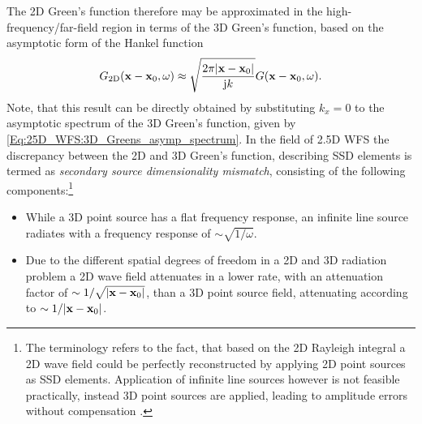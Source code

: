 \vspace{3mm}
The 2D Green's function therefore may be approximated in the high-frequency/far-field region in terms of the 3D Green's function, based on the asymptotic form of the Hankel function \cite[(10.2.6)]{Nist2010} 
\begin{equation}
G_{2\mathrm{D}}(\mathbf{x}- \mathbf{x}_0,\omega) \approx \sqrt{\frac{ 2\pi |\mathbf{x} - \mathbf{x}_0|}{\mathrm{j} k }}
G(\mathbf{x}-\mathbf{x}_0, \omega).
\label{eq:25D_WFS:2D_Greens_vs_3D} 
\end{equation}
Note, that this result can be directly obtained by substituting $k_x = 0$ to the asymptotic spectrum of the 3D Green's function, given by \eqref{Eq:25D_WFS:3D_Greens_asymp_spectrum}.
In the field of 2.5D WFS the discrepancy between the 2D and 3D Green's function, describing SSD elements is termed as \emph{secondary source dimensionality mismatch}, consisting of the following components:\footnote{The terminology refers to the fact, that based on the 2D Rayleigh integral a 2D wave field could be perfectly reconstructed by applying 2D point sources as SSD elements. Application of infinite line sources however is not feasible practically, instead 3D point sources are applied, leading to amplitude errors without compensation \cite{Spors2008:WFSrevisited}.}
\begin{itemize}
\item While a 3D point source has a flat frequency response, an infinite line source radiates with a frequency response of $\sim \sqrt{1/\omega}$. 
\item Due to the different spatial degrees of freedom in a 2D and 3D radiation problem a 2D wave field attenuates in a lower rate, with an attenuation factor of $\sim 1/\sqrt{|\mathbf{x}-\mathbf{x}_0|}$, than a 3D point source field, attenuating according to $\sim 1/|\mathbf{x}-\mathbf{x}_0|$.
\end{itemize}


